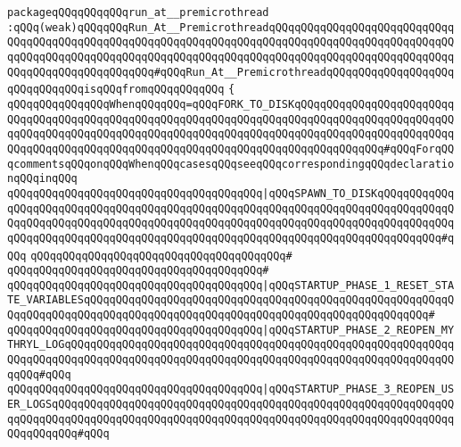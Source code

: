\newline
\newline
\newline
\verb|packageqQQqqQQqqQQqrun_at__premicrothread|\newline
\verb|:qQQq(weak)qQQqqQQqRun_At__PremicrothreadqQQqqQQqqQQqqQQqqQQqqQQqqQQqqQQqqQQqqQQqqQQqqQQqqQQqqQQqqQQqqQQqqQQqqQQqqQQqqQQqqQQqqQQqqQQqqQQqqQQqqQQqqQQqqQQqqQQqqQQqqQQqqQQqqQQqqQQqqQQqqQQqqQQqqQQqqQQqqQQqqQQqqQQqqQQqqQQqqQQqqQQqqQQqqQQq#qQQqRun_At__PremicrothreadqQQqqQQqqQQqqQQqqQQqqQQqqQQqqQQqisqQQqfromqQQqqQQqqQQq|\newline
\verb|{|\newline
\verb|qQQqqQQqqQQqqQQqWhenqQQqqQQq=qQQqFORK_TO_DISKqQQqqQQqqQQqqQQqqQQqqQQqqQQqqQQqqQQqqQQqqQQqqQQqqQQqqQQqqQQqqQQqqQQqqQQqqQQqqQQqqQQqqQQqqQQqqQQqqQQqqQQqqQQqqQQqqQQqqQQqqQQqqQQqqQQqqQQqqQQqqQQqqQQqqQQqqQQqqQQqqQQqqQQqqQQqqQQqqQQqqQQqqQQqqQQqqQQqqQQqqQQqqQQqqQQqqQQqqQQqqQQq#qQQqForqQQqcommentsqQQqonqQQqWhenqQQqcasesqQQqseeqQQqcorrespondingqQQqdeclarationqQQqinqQQq|\newline
\verb|qQQqqQQqqQQqqQQqqQQqqQQqqQQqqQQqqQQqqQQq|\verb#|qQQqSPAWN_TO_DISKqQQqqQQqqQQqqQQqqQQqqQQqqQQqqQQqqQQqqQQqqQQqqQQqqQQqqQQqqQQqqQQqqQQqqQQqqQQqqQQqqQQqqQQqqQQqqQQqqQQqqQQqqQQqqQQqqQQqqQQqqQQqqQQqqQQqqQQqqQQqqQQqqQQqqQQqqQQqqQQqqQQqqQQqqQQqqQQqqQQqqQQqqQQqqQQqqQQqqQQqqQQqqQQqqQQqqQQqqQQq#\verb|#qQQq|\newline
\verb|qQQqqQQqqQQqqQQqqQQqqQQqqQQqqQQqqQQqqQQq#|\newline
\verb|qQQqqQQqqQQqqQQqqQQqqQQqqQQqqQQqqQQqqQQq#|\newline
\verb|qQQqqQQqqQQqqQQqqQQqqQQqqQQqqQQqqQQqqQQq|\verb#|qQQqSTARTUP_PHASE_1_RESET_STATE_VARIABLESqQQqqQQqqQQqqQQqqQQqqQQqqQQqqQQqqQQqqQQqqQQqqQQqqQQqqQQqqQQqqQQqqQQqqQQqqQQqqQQqqQQqqQQqqQQqqQQqqQQqqQQqqQQqqQQqqQQqqQQqqQQq#\verb|#|\newline
\verb|qQQqqQQqqQQqqQQqqQQqqQQqqQQqqQQqqQQqqQQq|\verb#|qQQqSTARTUP_PHASE_2_REOPEN_MYTHRYL_LOGqQQqqQQqqQQqqQQqqQQqqQQqqQQqqQQqqQQqqQQqqQQqqQQqqQQqqQQqqQQqqQQqqQQqqQQqqQQqqQQqqQQqqQQqqQQqqQQqqQQqqQQqqQQqqQQqqQQqqQQqqQQqqQQqqQQqqQQq#\verb|#qQQq|\newline
\verb|qQQqqQQqqQQqqQQqqQQqqQQqqQQqqQQqqQQqqQQq|\verb#|qQQqSTARTUP_PHASE_3_REOPEN_USER_LOGSqQQqqQQqqQQqqQQqqQQqqQQqqQQqqQQqqQQqqQQqqQQqqQQqqQQqqQQqqQQqqQQqqQQqqQQqqQQqqQQqqQQqqQQqqQQqqQQqqQQqqQQqqQQqqQQqqQQqqQQqqQQqqQQqqQQqqQQqqQQqqQQq#\verb|#qQQq|\newline
